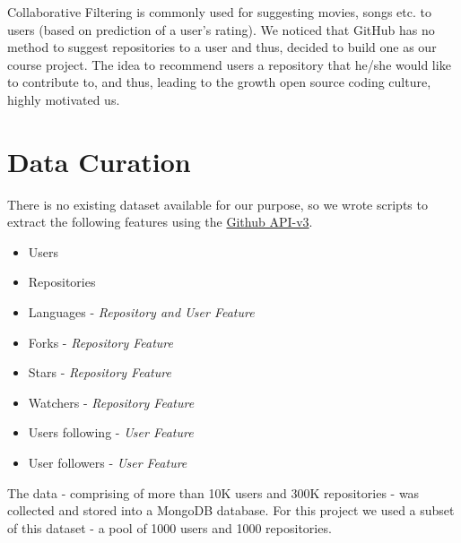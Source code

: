 \documentclass[conference]{IEEEtran}
\begin{document}
Collaborative Filtering is commonly used for suggesting movies, songs etc. to users (based on prediction of a user's rating). We noticed that GitHub has no method to suggest repositories to a user and thus, decided to build one as our course project. The idea to recommend users a repository that he/she would like to contribute to, and thus, leading to the growth open source coding culture, highly motivated us.






\section{\textbf{Data Curation}}
There is no existing dataset available for our purpose, so we wrote scripts to extract the following features using the \href{https://developer.github.com/v3/}{Github API-v3}.
\begin{itemize}
  \item Users
  \item Repositories
  \item Languages - \textit{Repository and User Feature}
  \item Forks - \textit{Repository Feature}
  \item Stars - \textit{Repository Feature}
  \item Watchers - \textit{Repository Feature}
  \item Users following - \textit{User Feature}
  \item User followers - \textit{User Feature}
\end{itemize}
The data - comprising of more than 10K users and 300K repositories - was collected and stored into a MongoDB database. For this project we used a subset of this dataset - a pool of 1000 users and 1000 repositories.\\
\end{document}
